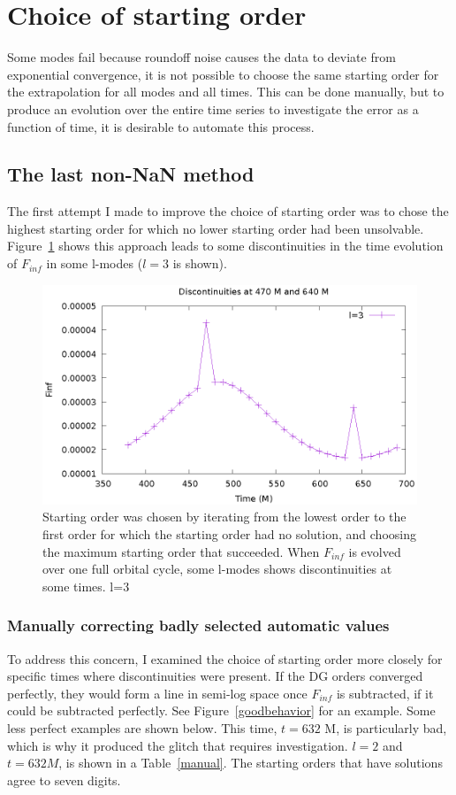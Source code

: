 \section{Choice of starting order}

Some modes fail because roundoff noise causes the data to deviate from exponential convergence, it is not possible to choose the same starting order for the extrapolation for all modes and all times. This can be done manually, but to produce an evolution over the entire time series to investigate the error as a function of time, it is desirable to automate this process.

\subsection{The last non-NaN method}

The first attempt I made to improve the choice of starting order was to chose the highest starting order for which no lower starting order had been unsolvable. Figure~\ref{finfovertimediscont} shows this approach leads to some discontinuities in the time evolution of $F_{inf}$ in some l-modes ($l=3$ is shown). 


\begin{figure}
  \includegraphics{finfovertimel3discontinuities}
  \caption{Starting order was chosen by iterating from the lowest order to the first order for which the starting order had no solution, and choosing the maximum starting order that succeeded. When $F_{inf}$ is evolved over one full orbital cycle, some l-modes shows discontinuities at some times. l=3}
\label{finfovertimediscont}
\end{figure}

\subsubsection{Manually correcting badly selected automatic values}
To address this concern, I examined the choice of starting order more closely for specific times where discontinuities were present. If the DG orders converged perfectly, they would form a line in semi-log space once $F_{inf}$ is subtracted, if it could be subtracted perfectly. See Figure~\ref{goodbehavior} for an example. Some less perfect examples are shown below. This time, $t=632$ M, is particularly bad, which is why it produced the glitch that requires investigation. $l=2$ and $t=632M$, is shown in a Table~\ref{manual}. The starting orders that have solutions agree to seven digits. 


